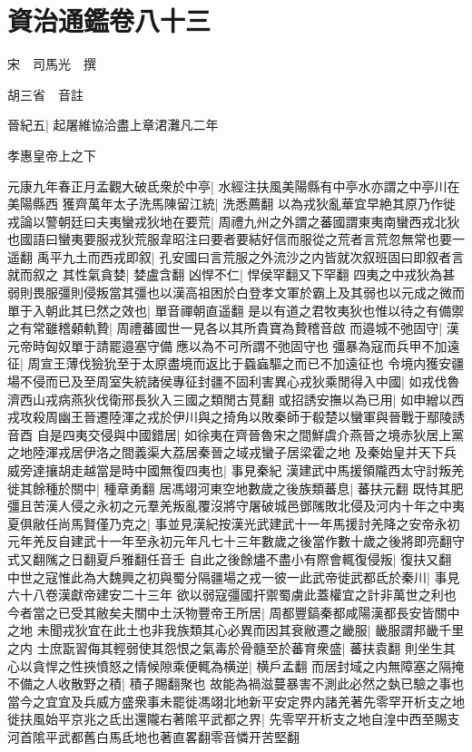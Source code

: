 \chapter{資治通鑑卷八十三}
宋　司馬光　撰

胡三省　音註

晉紀五|{
	起屠維協洽盡上章涒灘凡二年}


孝惠皇帝上之下

元康九年春正月孟觀大破氐衆於中亭|{
	水經注扶風美陽縣有中亭水亦謂之中亭川在美陽縣西}
獲齊萬年太子洗馬陳留江統|{
	洗悉薦翻}
以為戎狄亂華宜早絶其原乃作徙戎論以警朝廷曰夫夷蠻戎狄地在要荒|{
	周禮九州之外謂之蕃國謂東夷南蠻西戎北狄也國語曰蠻夷要服戎狄荒服韋昭注曰要者要結好信而服從之荒者言荒忽無常也要一遥翻}
禹平九土而西戎即叙|{
	孔安國曰言荒服之外流沙之内皆就次叙班固曰即叙者言就而叙之}
其性氣貪婪|{
	婪盧含翻}
凶悍不仁|{
	悍侯罕翻又下罕翻}
四夷之中戎狄為甚弱則畏服彊則侵叛當其彊也以漢高祖困於白登孝文軍於霸上及其弱也以元成之微而單于入朝此其巳然之效也|{
	單音禪朝直遥翻}
是以有道之君牧夷狄也惟以待之有備禦之有常雖稽顙軌贄|{
	周禮蕃國世一見各以其所貴寶為贄稽音啟}
而邉城不弛固守|{
	漢元帝時匈奴單于請罷邉塞守備應以為不可所謂不弛固守也}
彊暴為寇而兵甲不加遠征|{
	周宣王薄伐獫狁至于太原盡境而返比于蟁蝱驅之而已不加遠征也}
令境内獲安疆場不侵而已及至周室失統諸侯專征封疆不固利害異心戎狄乘閒得入中國|{
	如戎伐魯濟西山戎病燕狄伐衛邢長狄入三國之類閒古莧翻}
或招誘安撫以為已用|{
	如申繒以西戎攻殺周幽王晉遷陸渾之戎於伊川與之掎角以敗秦師于殽楚以蠻軍與晉戰于鄢陵誘音酉}
自是四夷交侵與中國錯居|{
	如徐夷在齊晉魯宋之間鮮虞介燕晉之境赤狄居上黨之地陸渾戎居伊洛之間義渠大荔居秦晉之域戎蠻子居梁霍之地}
及秦始皇并天下兵威旁達攘胡走越當是時中國無復四夷也|{
	事見秦紀}
漢建武中馬援領隴西太守討叛羌徙其餘種於關中|{
	種章勇翻}
居馮翊河東空地數歲之後族類蕃息|{
	蕃扶元翻}
既恃其肥彊且苦漢人侵之永初之元羣羌叛亂覆沒將守屠破城邑鄧隲敗北侵及河内十年之中夷夏俱敝任尚馬賢僅乃克之|{
	事並見漢紀按漢光武建武十一年馬援討羌降之安帝永初元年羌反自建武十一年至永初元年凡七十三年數歲之後當作數十歲之後將即亮翻守式又翻隲之日翻夏戶雅翻任音壬}
自此之後餘燼不盡小有際會輒復侵叛|{
	復扶又翻}
中世之寇惟此為大魏興之初與蜀分隔疆場之戎一彼一此武帝徙武都氐於秦川|{
	事見六十八卷漢獻帝建安二十三年}
欲以弱寇彊國扞禦蜀虜此蓋權宜之計非萬世之利也今者當之已受其敝矣夫關中土沃物豐帝王所居|{
	周都豐鎬秦都咸陽漢都長安皆關中之地}
未聞戎狄宜在此土也非我族類其心必異而因其衰敝遷之畿服|{
	畿服謂邦畿千里之内}
士庶翫習侮其輕弱使其怨恨之氣毒於骨髓至於蕃育衆盛|{
	蕃扶袁翻}
則坐生其心以貪悍之性挾憤怒之情候隙乘便輒為横逆|{
	横戶孟翻}
而居封域之内無障塞之隔掩不備之人收散野之積|{
	積子賜翻聚也}
故能為禍滋蔓暴害不測此必然之埶已驗之事也當今之宜宜及兵威方盛衆事未罷徙馮翊北地新平安定界内諸羌著先零罕开析支之地徙扶風始平京兆之氐出還隴右著隂平武都之界|{
	先零罕开析支之地自湟中西至賜支河首隂平武都舊白馬氐地也著直畧翻零音憐开苦堅翻}
